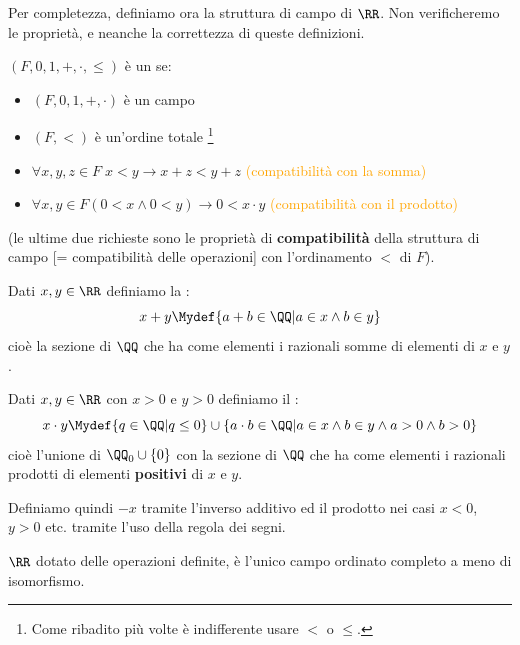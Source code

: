 Per completezza, definiamo ora la struttura di campo di $\RR$. Non verificheremo le proprietà, e neanche la correttezza di queste definizioni.

\begin{definition}
	$(F,0,1,+,\cdot,\leq)$ è un  se:
	\begin{itemize}
		\item $(F,0,1,+,\cdot)$ è un campo
		\item $(F,<)$ è un'ordine totale \footnote{Come ribadito più volte è indifferente usare $<$ o $\leq$.}
		\item $\forall x,y,z \in F \; x < y \rightarrow x + z < y + z$ \textcolor{orange}{(compatibilità con la somma)}
		\item $\forall x,y \in F (0 < x \land 0 < y) \rightarrow 0 < x \cdot y$ \textcolor{orange}{(compatibilità con il prodotto)}
	\end{itemize}
	(le ultime due richieste sono le proprietà di \textbf{compatibilità} della struttura di campo [= compatibilità delle operazioni] con l'ordinamento $<$ di $F$).
\end{definition}

\begin{definition}[Somma su $\RR$]
	Dati $x,y \in \RR$ definiamo la :
	\[ x + y \Mydef \{a + b \in \QQ | a \in x \land b \in y\}
		\]
	cioè la sezione di $\QQ$ che ha come elementi i razionali somme di elementi di $x$ e $y$.
\end{definition}

\begin{definition}[Prodotto su $\RR$]
	Dati $x,y \in \RR$ con $x > 0$ e $y > 0$ definiamo il :
	\[ x \cdot y \Mydef \{q \in \QQ | q \leq 0\} \cup \{a\cdot b \in \QQ| a \in x  \land b \in y \land a > 0 \land b > 0\}
		\]
	cioè l'unione di $\QQ_0 \cup \{0\}$ con la sezione di $\QQ$ che ha come elementi i razionali prodotti di elementi \textbf{positivi} di $x$ e $y$.
\end{definition}

Definiamo quindi $-x$ tramite l'inverso additivo ed il prodotto nei casi $x < 0$, $y>0$ etc. tramite l'uso della regola dei segni.

\begin{theorem}
	$\RR$ dotato delle operazioni definite, è l'unico campo ordinato completo a meno di isomorfismo.
\end{theorem}


